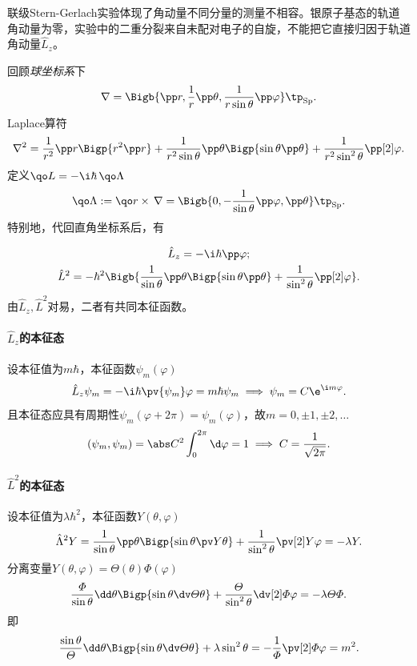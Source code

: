 联级Stern-Gerlach实验体现了角动量不同分量的测量不相容。银原子基态的轨道角动量为零，实验中的二重分裂来自未配对电子的自旋，不能把它直接归因于轨道角动量$\hat L_z$。

回顾\textit{球坐标系}下
\[
	\nabla=\Bigb{\pp r,\frac1r\pp\theta,\frac1{r\sin\theta}\pp\varphi}\tp_\mathrm{Sp}.
\]
Laplace算符
\[
	\nabla^2=\frac1{r^2}\pp r\Bigp{r^2\pp r}+\frac1{r^2\sin\theta}\pp\theta\Bigp{\sin\theta\pp\theta}+\frac1{r^2\sin^2\theta}\pp[2]\varphi.
\]
定义$\qo L=-\i\hbar\,\qo\Lambda$
\[
	\qo\Lambda:=\qo r\times\,\nabla=\Bigb{0,-\frac1{\sin\theta}\pp\varphi,\pp\theta}\tp_\mathrm{Sp}.
\]
特别地，代回直角坐标系后，有

\begin{gather}
	\hat L_z=-\i\hbar\pp\varphi;\\
	\hat L^2=-\hbar^2\Bigb{\frac1{\sin\theta}\pp\theta\Bigp{\sin\theta\pp\theta}+\frac1{\sin^2\theta}\pp[2]\varphi}.
\end{gather}
由$\hat L_z,\hat L^2$对易，二者有共同本征函数。
\paragraph{$\hat L_z$的本征态}设本征值为$m\hbar$，本征函数$\psi_m(\varphi)$
\[
	\hat L_z\psi_m=-\i\hbar\pv{\psi_m}\varphi=m\hbar\psi_m\implies\psi_m=C\e^{\i m\varphi}.
\]
且本征态应具有周期性$\psi_m(\varphi+2\pi)=\psi_m(\varphi)$，故$m=0,\pm 1,\pm 2,\ldots$
\[
	(\psi_m,\psi_m)=\abs C^2\int_0^{2\pi}\d\varphi=1\implies C=\frac1{\sqrt{2\pi}}.
\]
\paragraph{$\hat L^2$的本征态}设本征值为$\lambda\hbar^2$，本征函数$Y(\theta,\varphi)$
\[
	\hat\Lambda^2Y=\frac1{\sin\theta}\pp\theta\Bigp{\sin\theta\pv Y\theta}+\frac1{\sin^2\theta}\pv[2]Y\varphi=-\lambda Y.
\]
分离变量$Y(\theta,\varphi)=\varTheta(\theta)\varPhi(\varphi)$
\[
	\frac\varPhi{\sin\theta}\dd\theta\Bigp{\sin\theta\dv\varTheta\theta}+\frac\varTheta{\sin^2\theta}\dv[2]\varPhi\varphi=-\lambda\varTheta\varPhi.
\]
即
\[
	\frac{\sin\theta}\varTheta\dd\theta\Bigp{\sin\theta\dv\varTheta\theta}+\lambda\sin^2\theta=-\frac1\varPhi\pv[2]\varPhi\varphi=m^2.
\]

